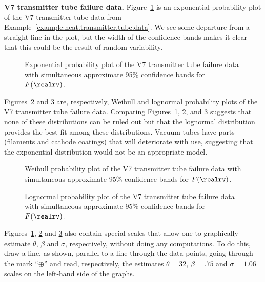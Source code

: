 \begin{example}
{\bf V7 transmitter tube failure data.}
Figure~\ref{figure:v7tube.npp.exp.ps} is an exponential probability plot
of the V7 transmitter tube data from
Example~\ref{example:heat.transmitter.tube.data}. We see some departure from
a straight line in the plot, but the width of the
confidence bands makes it clear that this could be the result of
random variability.
\begin{figure}
\caption{Exponential probability plot of the V7 transmitter
tube failure data with 
simultaneous approximate 95\% confidence bands for $F(\realrv)$.}
\label{figure:v7tube.npp.exp.ps}
\end{figure}

Figures~\ref{figure:v7tube.npp.weib.ps} and
\ref{figure:v7tube.npp.lnor.ps} are, respectively, Weibull 
and lognormal probability plots
of the V7 transmitter tube failure data. Comparing 
Figures~\ref{figure:v7tube.npp.exp.ps},
\ref{figure:v7tube.npp.weib.ps},
and \ref{figure:v7tube.npp.lnor.ps} suggests that none of these
distributions can be ruled out but that the lognormal
distribution provides the best fit among these distributions.  Vacuum
tubes have parts (filaments and cathode coatings) that will
deteriorate with use, suggesting that the exponential distribution
would not be an appropriate model.

\begin{figure}
\caption{Weibull probability plot of the V7 transmitter
tube failure data with
simultaneous approximate 95\% confidence bands for $F(\realrv)$.}
\label{figure:v7tube.npp.weib.ps}
\end{figure}
\begin{figure}
\caption{Lognormal probability plot of the V7 transmitter
tube failure data with
simultaneous approximate 95\% confidence bands for $F(\realrv)$.}
\label{figure:v7tube.npp.lnor.ps}
\end{figure}
Figures~\ref{figure:v7tube.npp.exp.ps}, \ref{figure:v7tube.npp.weib.ps} and
\ref{figure:v7tube.npp.lnor.ps} also contain special scales
that allow one to graphically estimate $\theta$, $\beta$ and $\sigma$,
respectively, without doing any computations. To do this,
draw a line, as shown, parallel to a line through
the data points, going through the
mark ``$\oplus$'' and read, respectively,
the estimates $\theta=32$, $\beta=.75$ and $\sigma=1.06$ scales
on the left-hand side of the graphs.
\end{example}



